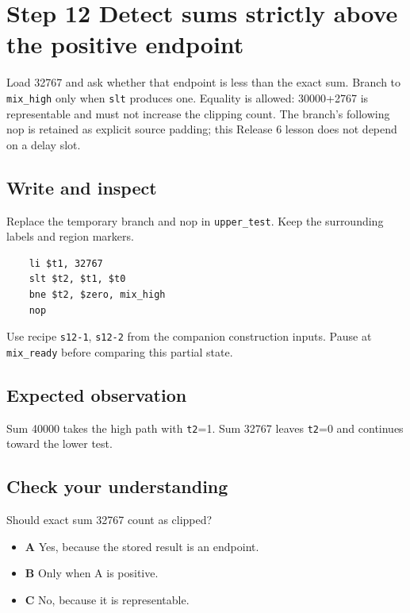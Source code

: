 \section{Step 12 Detect sums strictly above the positive endpoint}\label{pcm-s12}

Load 32767 and ask whether that endpoint is less than the exact sum. Branch to \texttt{mix\_high} only when \texttt{slt} produces one. Equality is allowed: 30000+2767 is representable and must not increase the clipping count. The branch’s following nop is retained as explicit source padding; this Release 6 lesson does not depend on a delay slot.

\subsection{Write and inspect}
Replace the temporary branch and nop in \texttt{upper\_test}. Keep the surrounding labels and region markers.

\begin{verbatim}
    li $t1, 32767
    slt $t2, $t1, $t0
    bne $t2, $zero, mix_high
    nop
\end{verbatim}
Use recipe \texttt{s12-1}, \texttt{s12-2} from the companion construction inputs. Pause at \texttt{mix\_ready} before comparing this partial state.

\subsection{Expected observation}
Sum 40000 takes the high path with \texttt{t2}=1. Sum 32767 leaves \texttt{t2}=0 and continues toward the lower test.

\subsection{Check your understanding}
Should exact sum 32767 count as clipped?

\begin{itemize}
  \item \textbf{A} Yes, because the stored result is an endpoint.
  \item \textbf{B} Only when A is positive.
  \item \textbf{C} No, because it is representable.
\end{itemize}
